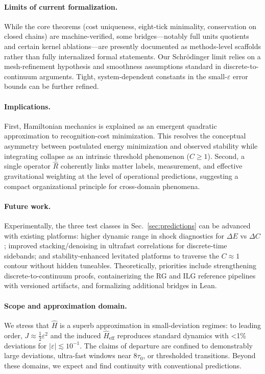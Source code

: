 \documentclass[aps,prx,twocolumn,superscriptaddress,nofootinbib]{revtex4-2}
\newcommand{\Rhat}{\hat{R}}
\newcommand{\Hhat}{\hat{H}}
\newcommand{\Jcost}{J}
\newcommand{\Ccost}{C}
\newcommand{\TauZero}{\tau_{0}}
\begin{document}
\paragraph*{Limits of current formalization.} While the core theorems (cost uniqueness, eight-tick minimality, conservation on closed chains) are machine-verified, some bridges---notably full units quotients and certain kernel ablations---are presently documented as methods-level scaffolds rather than fully internalized formal statements. Our Schrödinger limit relies on a mesh-refinement hypothesis and smoothness assumptions standard in discrete-to-continuum arguments. Tight, system-dependent constants in the small-\(\varepsilon\) error bounds can be further refined.

\paragraph*{Implications.} First, Hamiltonian mechanics is explained as an emergent quadratic approximation to recognition-cost minimization. This resolves the conceptual asymmetry between postulated energy minimization and observed stability while integrating collapse as an intrinsic threshold phenomenon (\(\Ccost\ge 1\)). Second, a single operator \(\Rhat\) coherently links matter labels, measurement, and effective gravitational weighting at the level of operational predictions, suggesting a compact organizational principle for cross-domain phenomena.

\paragraph*{Future work.} Experimentally, the three test classes in Sec.~\ref{sec:predictions} can be advanced with existing platforms: higher dynamic range in shock diagnostics for \(\Delta E\) vs \(\Delta\Ccost\); improved stacking/denoising in ultrafast correlations for discrete-time sidebands; and stability-enhanced levitated platforms to traverse the \(\Ccost\approx 1\) contour without hidden tuneables. Theoretically, priorities include strengthening discrete-to-continuum proofs, containerizing the RG and ILG reference pipelines with versioned artifacts, and formalizing additional bridges in Lean.

\paragraph*{Scope and approximation domain.} We stress that \(\Hhat\) is a superb approximation in small-deviation regimes: to leading order, \(\Jcost\approx \tfrac12\varepsilon^2\) and the induced \(\Hhat_{\!\mathrm{eff}}\) reproduces standard dynamics with <1\% deviations for \(|\varepsilon|\lesssim 10^{-1}\). The claims of departure are confined to demonstrably large deviations, ultra-fast windows near \(8\TauZero\), or thresholded transitions. Beyond these domains, we expect and find continuity with conventional predictions.
\end{document}
